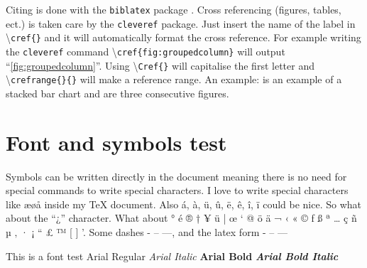 Citing is done with the \texttt{biblatex} package \cite{publication1}. Cross referencing (figures, tables, ect.) is taken care by the \texttt{cleveref} package. Just insert the name of the label in \textbackslash \texttt{cref\{\}} and it will automatically format the cross reference. For example writing the \texttt{cleveref} command \textbackslash \texttt{cref\{fig:groupedcolumn\}} will output ``\cref{fig:groupedcolumn}''. Using \textbackslash \texttt{Cref\{\}} will capitalise the first letter and \textbackslash \texttt{crefrange\{\}\{\}} will make a reference range. An example:  is an example of a stacked bar chart and  are three consecutive figures.

\section{Font and symbols test}
Symbols can be written directly in the document meaning there is no need for special commands to write special characters. I love to write special characters like æøå inside my \TeX{} document. Also á, à, ü, û, ë, ê, î, ï could be nice. So what about the ``¿'' character. What about ° é ® † ¥ ü | œ ‘ @ ö ä ¬ ‹ « © ƒ ß ª … ç ñ µ ‚ · ¡ “ £ ™ [ ] '. Some dashes - – —, and the latex form - -- --- 

This is a font test \newline 
Arial Regular \newline 
\textit{Arial Italic} \newline 
\textbf{Arial Bold} \newline 
\textbf{\textit{Arial Bold Italic}}
